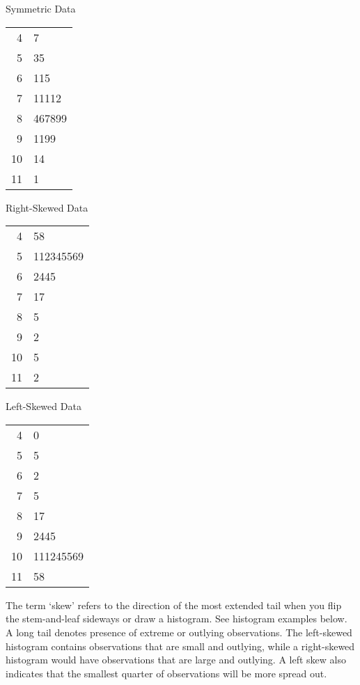 \documentclass[11pt]{book}\usepackage[]{graphicx}\usepackage[]{color}
\begin{document}
\begin{minipage}[ht]{4.5cm}

Symmetric Data



\begin{tabular}{@{} r|l @{}} \hline
4 & 7 \\
5 & 35 \\
6 & 115 \\
7 & 11112 \\
8 & 467899 \\
9 & 1199 \\
10 & 14 \\
11 & 1 \\ \hline
\end{tabular}
\end{minipage}
\begin{minipage}[ht]{4.5cm}

Right-Skewed Data



\begin{tabular}{@{} r|l @{}} \hline
4 & 58 \\
5 & 112345569 \\
6 & 2445 \\
7 & 17 \\
8 & 5 \\
9 & 2 \\
10 & 5 \\
11 & 2 \\ \hline
\end{tabular}
\end{minipage}
\begin{minipage}[ht]{4.5cm}

Left-Skewed Data




\begin{tabular}{@{} r|l} \hline
4 & 0 \\
5 & 5 \\
6 & 2 \\
7 & 5\\
8 & 17 \\
9 & 2445 \\
10 & 111245569 \\
11 & 58 \\ \hline
\end{tabular}
\end{minipage}

\vspace{1cm}

The term `skew' refers to the direction of the most extended tail when you flip the stem-and-leaf sideways or draw a histogram. See histogram examples below. A long tail denotes presence of extreme or outlying observations.  The left-skewed histogram contains observations that are small and outlying, while a right-skewed histogram would have observations that are large and outlying.  A left skew also indicates that the smallest quarter of observations will be more spread out.
\end{document}
